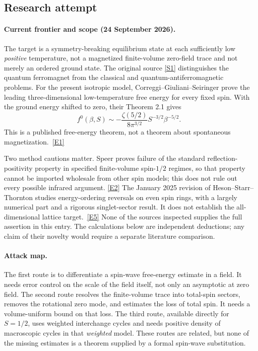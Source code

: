 \documentclass[11pt]{article}
\newcommand{\sref}[2]{\hyperlink{source:#1:#2}{[S#2]}}
\newcommand{\eref}[2]{\hyperlink{extra:#1:#2}{[E#2]}}
\begin{document}
	\subsection{Research attempt}
	
	\paragraph{Current frontier and scope (24 September 2026).}
	The target is a symmetry-breaking equilibrium state at each sufficiently
	low \emph{positive} temperature, not a magnetized finite-volume zero-field
	trace and not merely an ordered ground state. The original source
	\sref{statement}{1} distinguishes the quantum ferromagnet from the classical
	and quantum-antiferromagnetic problems. For the present isotropic model,
	Correggi--Giuliani--Seiringer prove the leading three-dimensional
	low-temperature free energy for every fixed spin. With the ground
	energy shifted to zero, their Theorem 2.1 gives
	\[
	f^0(\beta,S)\sim
	-\frac{\zeta(5/2)}{8\pi^{3/2}}S^{-3/2}\beta^{-5/2}.
	\]
	This is a published free-energy theorem, not a theorem about spontaneous
	magnetization.\ \eref{statement}{1}
	
	Two method cautions matter. Speer proves failure of the standard
	reflection-positivity property in specified finite-volume spin-$1/2$
	regimes, so that property cannot be imported wholesale from other spin
	models; this does not rule out every possible infrared argument.
	\eref{statement}{2} The January 2025 revision of Heson--Starr--Thornton studies
	energy-ordering reversals on even spin rings, with a largely numerical
	part and a rigorous singlet-sector result. It does not establish the
	all-dimensional lattice target.\ \eref{statement}{5}
	None of the sources inspected supplies the full assertion in this entry.
	The calculations below are independent deductions; any claim of their
	novelty would require a separate literature comparison.
	
	\paragraph{Attack map.}
	The first route is to differentiate a spin-wave free-energy estimate in
	a field. It needs error control on the scale of the field itself, not
	only an asymptotic at zero field. The second route resolves the
	finite-volume trace into total-spin sectors, removes the rotational
	zero mode, and estimates the loss of total spin. It needs a
	volume-uniform bound on that loss. The third route, available directly
	for $S=1/2$, uses weighted interchange cycles and needs positive density
	of macroscopic cycles in that \emph{weighted} model. These routes are
	related, but none of the missing estimates is a theorem supplied by a
	formal spin-wave substitution.
	
\end{document}

